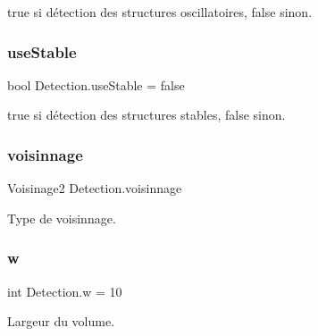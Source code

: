 true si détection des structures oscillatoires, false sinon. 

\mbox{\label{class_detection_a78bb8c89cca9479bb2bb4ef0f5e96945}} 
\subsubsection{\texorpdfstring{use\+Stable}{useStable}}
{\footnotesize\ttfamily bool Detection.\+use\+Stable = false\hspace{0.3cm}{\ttfamily [private]}}



true si détection des structures stables, false sinon. 

\mbox{\label{class_detection_a6f99794fd28f6f79dedfc541f8b78154}} 
\subsubsection{\texorpdfstring{voisinnage}{voisinnage}}
{\footnotesize\ttfamily Voisinage2 Detection.\+voisinnage\hspace{0.3cm}{\ttfamily [private]}}



Type de voisinnage. 

\mbox{\label{class_detection_a15fdbc0a47657ec7c4bf5228a950079d}} 
\subsubsection{\texorpdfstring{w}{w}}
{\footnotesize\ttfamily int Detection.\+w = 10\hspace{0.3cm}{\ttfamily [private]}}



Largeur du volume. 

